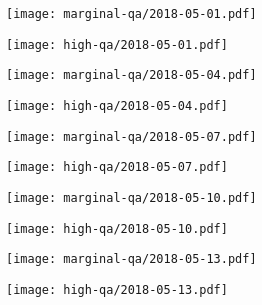 \documentclass{article}
\begin{document}
\begin{figure}[H]
    \centering
	\begin{subfigure}{0.48\linewidth}
		\texttt{[image: marginal-qa/2018-05-01.pdf]}
	\end{subfigure}
	\begin{subfigure}{0.48\linewidth}
		\texttt{[image: high-qa/2018-05-01.pdf]}
	\end{subfigure}
	\begin{subfigure}{0.48\linewidth}
		\texttt{[image: marginal-qa/2018-05-04.pdf]}
	\end{subfigure}
	\begin{subfigure}{0.48\linewidth}
		\texttt{[image: high-qa/2018-05-04.pdf]}
	\end{subfigure}
	\begin{subfigure}{0.48\linewidth}
		\texttt{[image: marginal-qa/2018-05-07.pdf]}
	\end{subfigure}
	\begin{subfigure}{0.48\linewidth}
		\texttt{[image: high-qa/2018-05-07.pdf]}
	\end{subfigure}
	\begin{subfigure}{0.48\linewidth}
		\texttt{[image: marginal-qa/2018-05-10.pdf]}
	\end{subfigure}
	\begin{subfigure}{0.48\linewidth}
		\texttt{[image: high-qa/2018-05-10.pdf]}
	\end{subfigure}
	\begin{subfigure}{0.48\linewidth}
		\texttt{[image: marginal-qa/2018-05-13.pdf]}
	\end{subfigure}
	\begin{subfigure}{0.48\linewidth}
		\texttt{[image: high-qa/2018-05-13.pdf]}
	\end{subfigure}
\end{figure}
\end{document}
